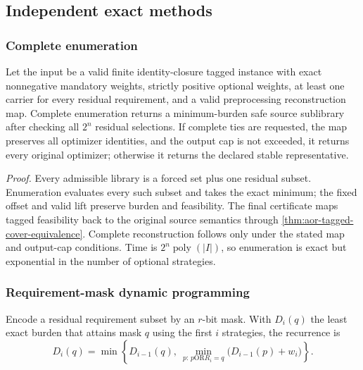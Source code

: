 \subsection{Independent exact methods}
\label{subsec:aor-exact-algorithms}

\subsubsection{Complete enumeration}

\begin{proposition}
\label{prop:aor-complete-enumeration}
Let the input be a valid finite identity-closure tagged instance with exact
nonnegative mandatory weights, strictly positive optional weights, at least one
carrier for every residual requirement, and a valid preprocessing
reconstruction map.  Complete enumeration returns a minimum-burden safe source
sublibrary after checking all \(2^n\) residual selections.  If complete ties
are requested, the map preserves all optimizer identities, and the output cap
is not exceeded, it returns every original optimizer; otherwise it returns the
declared stable representative.
\end{proposition}

\noindent\emph{Proof.}
Every admissible library is a forced set plus one residual subset.
Enumeration evaluates every such subset and takes the exact minimum; the fixed
offset and valid lift preserve burden and feasibility.  The final certificate
maps tagged feasibility back to the original source semantics through
\cref{thm:aor-tagged-cover-equivalence}.  Complete reconstruction follows only
under the stated map and output-cap conditions.  Time is
\(2^n\operatorname{poly}(|I|)\), so enumeration is exact but exponential in
the number of optional strategies.

\subsubsection{Requirement-mask dynamic programming}

Encode a residual requirement subset by an \(r\)-bit mask.  With
\(D_i(q)\) the least exact burden that attains mask \(q\) using the first
\(i\) strategies, the recurrence is
\begin{equation}
 D_i(q)=\min\left\{
 D_{i-1}(q),\
 \min_{p:\,p\mathbin{\mathrm{OR}}R_i=q}
      \bigl(D_{i-1}(p)+w_i\bigr)
 \right\}.
 \label{eq:aor-mask-dp-recurrence}
\end{equation}

